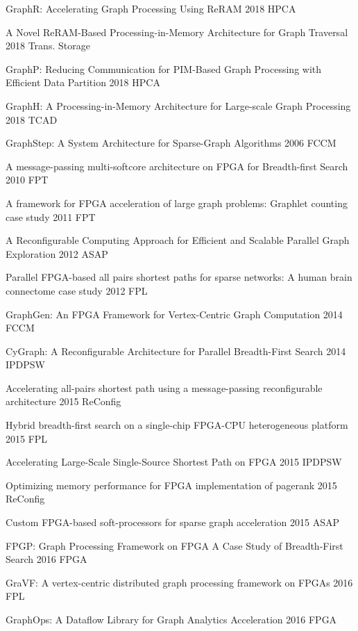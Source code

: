 \documentclass[twoside]{article}
\begin{document}
\begin{multicols}{2}
\begin{thebibliography}{99}
 GraphR: Accelerating Graph Processing Using ReRAM 2018 HPCA

 A Novel ReRAM-Based Processing-in-Memory Architecture for Graph Traversal 2018 Trans. Storage

 GraphP: Reducing Communication for PIM-Based Graph Processing with Efficient Data Partition 2018 HPCA

 GraphH: A Processing-in-Memory Architecture for Large-scale Graph Processing 2018 TCAD

 GraphStep: A System Architecture for Sparse-Graph Algorithms 2006 FCCM

 A message-passing multi-softcore architecture on FPGA for Breadth-first Search 2010 FPT

 A framework for FPGA acceleration of large graph problems: Graphlet counting case study 2011 FPT

 A Reconfigurable Computing Approach for Efficient and Scalable Parallel Graph Exploration 2012 ASAP

 Parallel FPGA-based all pairs shortest paths for sparse networks: A human brain connectome case study 2012 FPL

 GraphGen: An FPGA Framework for Vertex-Centric Graph Computation 2014 FCCM

 CyGraph: A Reconfigurable Architecture for Parallel Breadth-First Search 2014 IPDPSW

 Accelerating all-pairs shortest path using a message-passing reconfigurable architecture 2015 ReConfig

 Hybrid breadth-first search on a single-chip FPGA-CPU heterogeneous platform 2015 FPL

 Accelerating Large-Scale Single-Source Shortest Path on FPGA 2015 IPDPSW

 Optimizing memory performance for FPGA implementation of pagerank 2015 ReConfig

 Custom FPGA-based soft-processors for sparse graph acceleration 2015 ASAP

 FPGP: Graph Processing Framework on FPGA A Case Study of Breadth-First Search 2016 FPGA

 GraVF: A vertex-centric distributed graph processing framework on FPGAs 2016 FPL

 GraphOps: A Dataflow Library for Graph Analytics Acceleration 2016 FPGA


\end{thebibliography}
\end{multicols}
\end{document}

